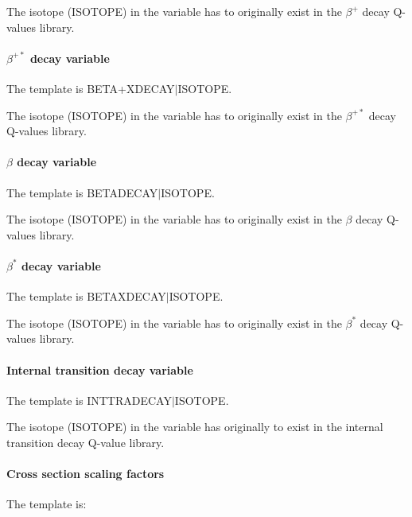 The isotope (ISOTOPE) in the variable has to originally exist in the $\beta^+$ decay Q-values library.

\paragraph{$\beta^{+*}$ decay variable} \label{BetaPlusStarPara}
The  template is BETA+XDECAY$\vert$ISOTOPE.

The isotope (ISOTOPE) in the variable has to originally exist in the $\beta^{+*}$ decay Q-values library.

\paragraph{$\beta$ decay variable} \label{BetaPara}
The  template is BETADECAY$\vert$ISOTOPE.

The isotope (ISOTOPE) in the variable has to originally exist in the $\beta$ decay Q-values library.

\paragraph{$\beta^{*}$ decay variable} \label{BetaStarPara}
The  template is BETAXDECAY$\vert$ISOTOPE.

The isotope (ISOTOPE) in the variable has to originally exist in the $\beta^*$ decay Q-values library.

\paragraph{Internal transition decay variable} \label{IntTraPara}
The  template is INTTRADECAY$\vert$ISOTOPE.

The isotope (ISOTOPE) in the variable has originally to exist in the internal transition decay Q-value library.

\paragraph{Cross section scaling factors} \label{XSPara}
The  template is:

